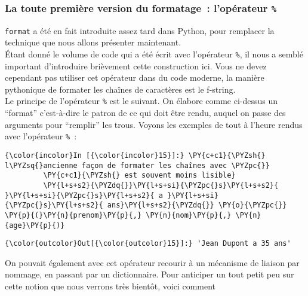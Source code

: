     \hypertarget{la-toute-premiuxe8re-version-du-formatage-lopuxe9rateur}{%
\subsubsection{\texorpdfstring{La toute première version du formatage~:
l'opérateur
\texttt{\%}}{La toute première version du formatage~: l'opérateur \%}}\label{la-toute-premiuxe8re-version-du-formatage-lopuxe9rateur}}

    \texttt{format} a été en fait introduite assez tard dans Python, pour
remplacer la technique que nous allons présenter maintenant.\\

Étant donné le volume de code qui a été écrit avec l'opérateur
\texttt{\%}, il nous a semblé important d'introduire brièvement cette
construction ici. Vous ne devez cependant pas utiliser cet opérateur
dans du code moderne, la manière pythonique de formater les chaînes de
caractères est le f-string.\\

    Le principe de l'opérateur \texttt{\%} est le suivant. On élabore comme
ci-dessus un ``format'' c'est-à-dire le patron de ce qui doit être
rendu, auquel on passe des arguments pour ``remplir'' les trous. Voyons
les exemples de tout à l'heure rendus avec l'opérateur \texttt{\%}~:

    \begin{Verbatim}[commandchars=\\\{\}]
{\color{incolor}In [{\color{incolor}15}]:} \PY{c+c1}{\PYZsh{} l\PYZsq{}ancienne façon de formater les chaînes avec \PYZpc{}}
         \PY{c+c1}{\PYZsh{} est souvent moins lisible}
         \PY{l+s+s2}{\PYZdq{}}\PY{l+s+si}{\PYZpc{}s}\PY{l+s+s2}{ }\PY{l+s+si}{\PYZpc{}s}\PY{l+s+s2}{ a }\PY{l+s+si}{\PYZpc{}s}\PY{l+s+s2}{ ans}\PY{l+s+s2}{\PYZdq{}} \PY{o}{\PYZpc{}} \PY{p}{(}\PY{n}{prenom}\PY{p}{,} \PY{n}{nom}\PY{p}{,} \PY{n}{age}\PY{p}{)}
\end{Verbatim}


\begin{Verbatim}[commandchars=\\\{\}]
{\color{outcolor}Out[{\color{outcolor}15}]:} 'Jean Dupont a 35 ans'
\end{Verbatim}
            
    On pouvait également avec cet opérateur recourir à un mécanisme de
liaison par nommage, en passant par un dictionnaire. Pour anticiper un
tout petit peu sur cette notion que nous verrons très bientôt, voici
comment

